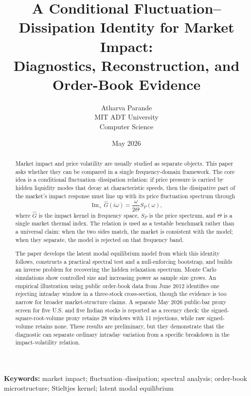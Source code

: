 \documentclass[11pt]{article}
\title{A Conditional Fluctuation--Dissipation Identity for Market Impact:\\
Diagnostics, Reconstruction, and Order-Book Evidence}
\author{Atharva Parande\\MIT ADT University\\Computer Science}
\date{May 2026}
\newcommand{\Ghat}{\widehat{G}}
\newcommand{\ImPart}{\operatorname{Im}_{\!+}}
\newcommand{\REV}{}
\begin{document}
\maketitle

\begin{abstract}
\REV
Market impact and price volatility are usually studied as separate objects. This paper asks whether they can be compared in a single frequency-domain framework. The core idea is a conditional fluctuation--dissipation relation: if price pressure is carried by hidden liquidity modes that decay at characteristic speeds, then the dissipative part of the market's impact response must line up with its price fluctuation spectrum through
\[
  \ImPart \Ghat(i\omega)=\frac{\omega}{2\Theta}S_P(\omega),
\]
where $\Ghat$ is the impact kernel in frequency space, $S_P$ is the price spectrum, and $\Theta$ is a single market thermal index. The relation is used as a testable benchmark rather than a universal claim: when the two sides match, the market is consistent with the model; when they separate, the model is rejected on that frequency band.

The paper develops the latent modal equilibrium model from which this identity follows, constructs a practical spectral test and a null-enforcing bootstrap, and builds an inverse problem for recovering the hidden relaxation spectrum. Monte Carlo simulations show controlled size and increasing power as sample size grows. An empirical illustration using public order-book data from June 2012 identifies one rejecting intraday window in a three-stock cross-section, though the evidence is too narrow for broader market-structure claims. A separate May 2026 public-bar proxy screen for five U.S. and five Indian stocks is reported as a recency check: the signed-square-root-volume proxy retains 28 windows with 11 rejections, while raw signed-volume retains none. These results are preliminary, but they demonstrate that the diagnostic can separate ordinary intraday variation from a specific breakdown in the impact-volatility relation.
\end{abstract}

\noindent\textbf{Keywords:} market impact; fluctuation--dissipation; spectral analysis; order-book microstructure; Stieltjes kernel; latent modal equilibrium
\end{document}
